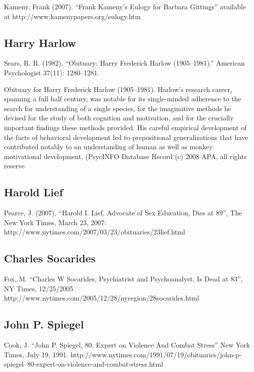 \begin{refsection}
\begin{appendices}
Kameny, Frank (2007). ``Frank Kameny's Eulogy for Barbara Gittings'' available at http:\slash \slash www.kamenypapers.org\slash eulogy.htm

\subsection{Harry Harlow}
\label{harryharlow}

Sears, R. R. (1982). ``Obituary: Harry Frederick Harlow (1905--1981).'' American Psychologist 37(11): 1280--1281. 

Obituary for Harry Frederick Harlow (1905--1981). Harlow's research career, spanning a full half century, was notable for its single-minded adherence to the search for understanding of a single species, for the imaginative methods he devised for the study of both cognition and motivation, and for the crucially important findings these methods provided. His careful empirical development of the facts of behavioral development led to prepositional generalizations that have contributed notably to an understanding of human as well as monkey motivational development. (PsycINFO Database Record (c) 2008 APA, all rights reserve 

\subsection{Harold Lief}
\label{haroldlief}

Pearce, J. (2007). ``Harold I. Lief, Advocate of Sex Education, Dies at 89'', The New York Times, March 23, 2007: http:\slash \slash www.nytimes.com\slash 2007\slash 03\slash 23\slash obituaries\slash 23lief.html 

\subsection{Charles Socarides}
\label{charlessocarides}

Fox, M. ``Charles W Socarides, Psychiatrist and Psychoanalyst, Is Dead at 83'', NY Times, 12\slash 25\slash 2005 http:\slash \slash www.nytimes.com\slash 2005\slash 12\slash 28\slash nyregion\slash 28socarides.html

\subsection{John P. Spiegel}
\label{johnp.spiegel}

Cook, J. ``John P. Spiegel, 80, Expert on Violence And Combat Stress'' New York Times, July 19, 1991. http:\slash \slash www.nytimes.com\slash 1991\slash 07\slash 19\slash obituaries\slash john-p-spiegel--80-expert-on-violence-and-combat-stress.html

\end{appendices}
\end{refsection}

